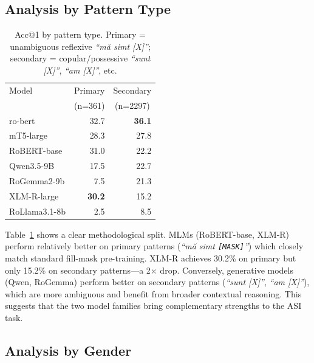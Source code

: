 \documentclass[11pt]{article}
\begin{document}
\subsection{Analysis by Pattern Type}

\begin{table}[t]
    \centering
    \small
    \begin{tabular}{lrr}
        \toprule
        Model & \multicolumn{1}{c}{Primary} & \multicolumn{1}{c}{Secondary} \\
        & \multicolumn{1}{c}{(n=361)} & \multicolumn{1}{c}{(n=2297)} \\
        \midrule
        ro-bert & 32.7 & \textbf{36.1} \\
        mT5-large & 28.3 & 27.8 \\
        RoBERT-base & 31.0 & 22.2 \\
        Qwen3.5-9B & 17.5 & 22.7 \\
        RoGemma2-9b & 7.5 & 21.3 \\
        XLM-R-large & \textbf{30.2} & 15.2 \\
        RoLlama3.1-8b & 2.5 & 8.5 \\
        \bottomrule
    \end{tabular}
    \caption{Acc@1 by pattern type. Primary = unambiguous reflexive \textit{``m\u{a} simt [X]''}; secondary = copular/possessive \textit{``sunt [X]''}, \textit{``am [X]''}, etc.}
    \label{tab:by-pattern}
\end{table}

Table~\ref{tab:by-pattern} shows a clear methodological split. MLMs (RoBERT-base, XLM-R) perform relatively better on primary patterns (\textit{``m\u{a} simt \texttt{[MASK]}''}) which closely match standard fill-mask pre-training. XLM-R achieves 30.2\% on primary but only 15.2\% on secondary patterns---a 2$\times$ drop. Conversely, generative models (Qwen, RoGemma) perform better on secondary patterns (\textit{``sunt [X]''}, \textit{``am [X]''}), which are more ambiguous and benefit from broader contextual reasoning. This suggests that the two model families bring complementary strengths to the ASI task.

\subsection{Analysis by Gender}
\end{document}
